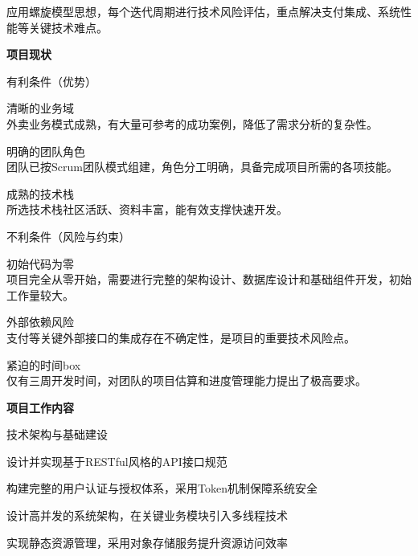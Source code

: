 \begin{levellist}
\begin{levellist}
    \end{levellist}

    \hspace{1.6em} 应用螺旋模型思想，每个迭代周期进行技术风险评估，重点解决支付集成、系统性能等关键技术难点。

    \item \textbf{项目现状}
    \begin{levellist}
        \item 有利条件（优势）
        \begin{levellist}
            \item 清晰的业务域 \\
            外卖业务模式成熟，有大量可参考的成功案例，降低了需求分析的复杂性。
            \item 明确的团队角色 \\
            团队已按Scrum团队模式组建，角色分工明确，具备完成项目所需的各项技能。
            \item 成熟的技术栈 \\
            所选技术栈社区活跃、资料丰富，能有效支撑快速开发。

        \end{levellist}

        \item 不利条件（风险与约束）
        \begin{levellist}
            \item 初始代码为零 \\
            项目完全从零开始，需要进行完整的架构设计、数据库设计和基础组件开发，初始工作量较大。
            \item 外部依赖风险 \\
            支付等关键外部接口的集成存在不确定性，是项目的重要技术风险点。
            \item 紧迫的时间box \\
            仅有三周开发时间，对团队的项目估算和进度管理能力提出了极高要求。

        \end{levellist}
    \end{levellist}


    \item \textbf{项目工作内容}
    \begin{levellist}
        \item 技术架构与基础建设
        \begin{levellist}
            \item 设计并实现基于RESTful风格的API接口规范
            \item 构建完整的用户认证与授权体系，采用Token机制保障系统安全
            \item 设计高并发的系统架构，在关键业务模块引入多线程技术
            \item 实现静态资源管理，采用对象存储服务提升资源访问效率
        \end{levellist}


\end{levellist}
\end{levellist}
